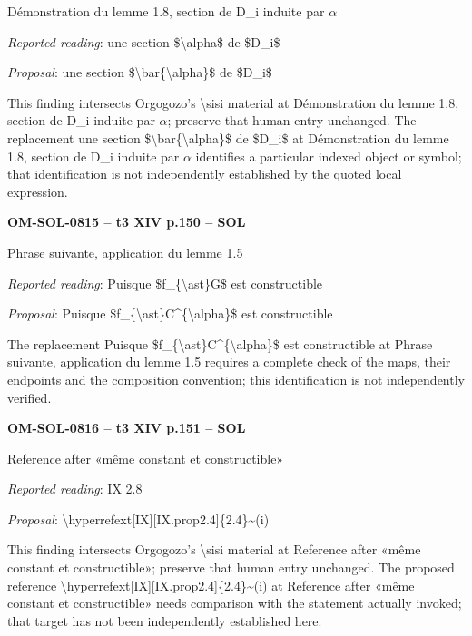 Démonstration du lemme 1.8, section de D\_i induite par \ensuremath{\alpha}\par
\emph{Reported reading}: une section \$\textbackslash{}alpha\$ de \$D\_i\$\par
\emph{Proposal}: une section \$\textbackslash{}bar\{\textbackslash{}alpha\}\$ de \$D\_i\$\par
This finding intersects Orgogozo's \textbackslash{}sisi material at Démonstration du lemme 1.8, section de D\_i induite par \ensuremath{\alpha}; preserve that human entry unchanged. The replacement une section \$\textbackslash{}bar\{\textbackslash{}alpha\}\$ de \$D\_i\$ at Démonstration du lemme 1.8, section de D\_i induite par \ensuremath{\alpha} identifies a particular indexed object or symbol; that identification is not independently established by the quoted local expression.\par
\par\noindent\textbf{OM-SOL-0815 -- t3 XIV p.150 -- SOL}\par
Phrase suivante, application du lemme 1.5\par
\emph{Reported reading}: Puisque \$f\_\{\textbackslash{}ast\}G\$ est constructible\par
\emph{Proposal}: Puisque \$f\_\{\textbackslash{}ast\}C\textasciicircum{}\{\textbackslash{}alpha\}\$ est constructible\par
The replacement Puisque \$f\_\{\textbackslash{}ast\}C\textasciicircum{}\{\textbackslash{}alpha\}\$ est constructible at Phrase suivante, application du lemme 1.5 requires a complete check of the maps, their endpoints and the composition convention; this identification is not independently verified.\par
\par\noindent\textbf{OM-SOL-0816 -- t3 XIV p.151 -- SOL}\par
Reference after «même constant et constructible»\par
\emph{Reported reading}: IX 2.8\par
\emph{Proposal}: \textbackslash{}hyperrefext[IX][IX.prop2.4]\{2.4\}\textasciitilde{}(i)\par
This finding intersects Orgogozo's \textbackslash{}sisi material at Reference after «même constant et constructible»; preserve that human entry unchanged. The proposed reference \textbackslash{}hyperrefext[IX][IX.prop2.4]\{2.4\}\textasciitilde{}(i) at Reference after «même constant et constructible» needs comparison with the statement actually invoked; that target has not been independently established here.\par
